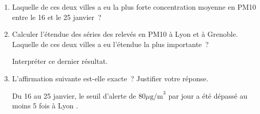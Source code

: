 \begin{enumerate}
     \item Laquelle de ces deux villes a eu la plus forte concentration moyenne en PM10 entre le 16 et le 25 janvier~?
     \item Calculer l'étendue des séries des relevés en PM10 à Lyon et à Grenoble. Laquelle de ces deux villes a eu l'étendue la plus importante~?
     \par
     Interpréter ce dernier résultat.
     \item L'affirmation suivante est-elle exacte~? Justifier votre réponse.
     \par
     \og Du 16 au 25 janvier, le seuil d'alerte de 80$\mu\text{g/m}^3$ par jour a été dépassé au moins 5 fois à Lyon \fg.
\end{enumerate}

